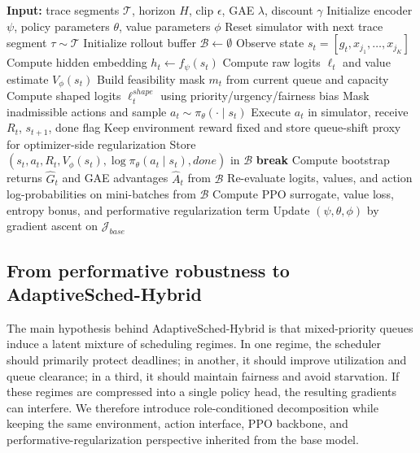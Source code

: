 \documentclass[journal]{IEEEtran}
\begin{document}
\begin{algorithm}[t]
\caption{AdaptiveSched-Base Training with Masked PPO}
\label{algo:base}
\begin{algorithmic}[1]
\State \textbf{Input:} trace segments $\mathcal{T}$, horizon $H$, clip $\epsilon$, GAE $\lambda$, discount $\gamma$
\State Initialize encoder $\psi$, policy parameters $\theta$, value parameters $\phi$
  \State Reset simulator with next trace segment $\tau \sim \mathcal{T}$
  \State Initialize rollout buffer $\mathcal{B}\leftarrow \emptyset$
    \State Observe state $s_t=[g_t,x_{j_1},\ldots,x_{j_K}]$
    \State Compute hidden embedding $h_t \leftarrow f_\psi(s_t)$
    \State Compute raw logits $\ell_t$ and value estimate $V_\phi(s_t)$
    \State Build feasibility mask $m_t$ from current queue and capacity
    \State Compute shaped logits $\ell_t^{shape}$ using priority/urgency/fairness bias
    \State Mask inadmissible actions and sample $a_t \sim \pi_\theta(\cdot\mid s_t)$
    \State Execute $a_t$ in simulator, receive $R_t$, $s_{t+1}$, done flag
    \State Keep environment reward fixed and store queue-shift proxy for optimizer-side regularization
    \State Store $(s_t,a_t,R_t,V_\phi(s_t),\log \pi_\theta(a_t\mid s_t),done)$ in $\mathcal{B}$
     \State \textbf{break} \EndIf
  \EndFor
  \State Compute bootstrap returns $\hat{G}_t$ and GAE advantages $\hat{A}_t$ from $\mathcal{B}$
    \State Re-evaluate logits, values, and action log-probabilities on mini-batches from $\mathcal{B}$
    \State Compute PPO surrogate, value loss, entropy bonus, and performative regularization term
    \State Update $(\psi,\theta,\phi)$ by gradient ascent on $\mathcal{J}_{base}$
  \EndFor
\EndFor
\end{algorithmic}
\end{algorithm}

\subsection{From performative robustness to AdaptiveSched-Hybrid}
The main hypothesis behind AdaptiveSched-Hybrid is that mixed-priority queues induce a latent mixture of scheduling regimes. In one regime, the scheduler should primarily protect deadlines; in another, it should improve utilization and queue clearance; in a third, it should maintain fairness and avoid starvation. If these regimes are compressed into a single policy head, the resulting gradients can interfere. We therefore introduce role-conditioned decomposition while keeping the same environment, action interface, PPO backbone, and performative-regularization perspective inherited from the base model.
\end{document}
